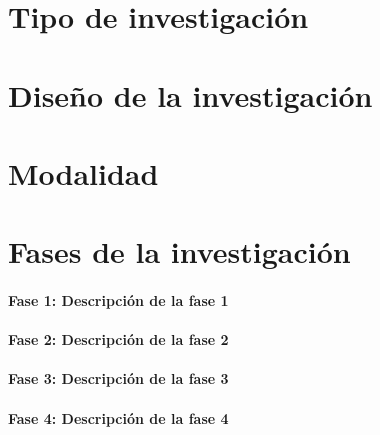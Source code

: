\section{Tipo de investigación}
	
	\blindtext

\section{Diseño de la investigación}

	\blindtext

\section{Modalidad}

	\blindtext

\section{Fases de la investigación}
	
	\paragraph{Fase 1: Descripción de la fase 1}
		
		\blindtext
		
	\paragraph{Fase 2: Descripción de la fase 2}
		
		\blindtext	
		
	\paragraph{Fase 3: Descripción de la fase 3}
		
		\blindtext
		
	\paragraph{Fase 4: Descripción de la fase 4}
		
		\blindtext



